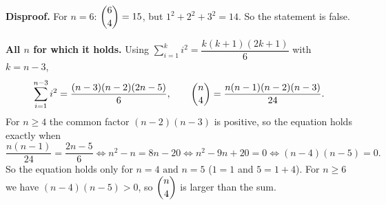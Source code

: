 \textbf{Disproof.} For $n=6$: $\dbinom64=15$, but $1^2+2^2+3^2=14$. So the statement is false.

\textbf{All $n$ for which it holds.} Using $\displaystyle\sum_{i=1}^{k}i^2=\dfrac{k(k+1)(2k+1)}{6}$ with $k=n-3$,
\[\sum_{i=1}^{n-3}i^2=\dfrac{(n-3)(n-2)(2n-5)}{6},\qquad\dbinom n4=\dfrac{n(n-1)(n-2)(n-3)}{24}.\]
For $n\ge4$ the common factor $(n-2)(n-3)$ is positive, so the equation holds exactly when
\[\dfrac{n(n-1)}{24}=\dfrac{2n-5}{6}\iff n^2-n=8n-20\iff n^2-9n+20=0\iff(n-4)(n-5)=0.\]
So the equation holds only for $\boxed{n=4\text{ and }n=5}$ ($1=1$ and $5=1+4$). For $n\ge6$ we have $(n-4)(n-5)>0$, so $\dbinom n4$ is larger than the sum.

